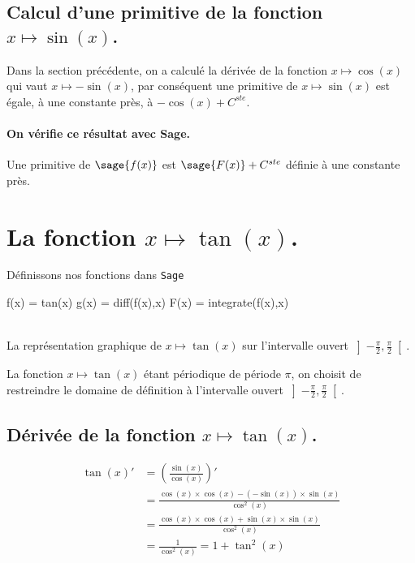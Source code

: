 \documentclass[a4paper,12pt]{report}
\begin{document}
\subsection{Calcul d'une primitive de la fonction  $x \mapsto \sin(x)$.}
Dans la section précédente, on a calculé la dérivée de la fonction $x \mapsto \cos(x)$ qui vaut $x \mapsto -\sin(x)$, par conséquent une primitive de $x \mapsto \sin(x)$ est égale, à une constante près, à $ - \cos(x) + C^{ste} $.
\paragraph{On vérifie ce résultat avec Sage.}
Une primitive de $\sage{f(x)}$ est $ \sage{F(x)} + C^{ste} $ définie à une constante près.



\section{La fonction  $x \mapsto \tan(x)$.}
Définissons nos fonctions dans {\texttt{Sage}}
\begin{sageblock}
    f(x) = tan(x)
    g(x) = diff(f(x),x)
    F(x) = integrate(f(x),x)
\end{sageblock}

\begin{center}
 \\
La représentation graphique de $x\mapsto \tan(x)$ sur l'intervalle ouvert $ \left] -\frac{\pi}{ 2} , \frac{\pi}{ 2} \right[ $.
\end{center}

La fonction $x \mapsto \tan(x)$ étant périodique de période $\pi$, on choisit de restreindre le domaine de définition à l'intervalle ouvert $ \left] -\frac{\pi}{ 2} , \frac{\pi}{ 2} \right[ $.

\subsection{Dérivée de la fonction $x \mapsto \tan(x)$.}
\begin{align*}
\tan(x)' 
& =  \left(\frac{\sin(x)}{\cos(x)}\right)' \\ 
& =  \frac{\cos(x) \times \cos(x) - (-\sin(x)) \times \sin(x)}{\cos^2(x)}  \\ 
& =  \frac{\cos(x) \times \cos(x) + \sin(x)\times \sin(x)}{\cos^2(x)}  \\ 
& =  \frac{1}{\cos^2(x)} = 1 + \tan^2(x)
\end{align*}
\end{document}
